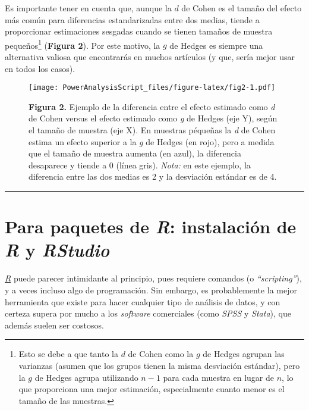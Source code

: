 \documentclass[
]{article}
\begin{document}
Es importante tener en cuenta que, aunque la \(d\) de Cohen es el tamaño
del efecto más común para diferencias estandarizadas entre dos medias,
tiende a proporcionar estimaciones sesgadas cuando se tienen tamaños de
muestra pequeños\footnote{Esto se debe a que tanto la \(d\) de Cohen
  como la \(g\) de Hedges agrupan las varianzas (asumen que los grupos
  tienen la misma desviación estándar), pero la \(g\) de Hedges agrupa
  utilizando \(n - 1\) para cada muestra en lugar de \(n\), lo que
  proporciona una mejor estimación, especialmente cuanto menor es el
  tamaño de las muestras.} (\textbf{Figura 2}). Por este motivo, la
\(g\) de Hedges es siempre una alternativa valiosa que encontrarás en
muchos artículos (y que, sería mejor usar en todos los casos).

\begin{figure}
\centering
\texttt{[image: PowerAnalysisScript\_files/figure-latex/fig2-1.pdf]}
\caption{\textbf{Figura 2.} Ejemplo de la diferencia entre el efecto
estimado como \emph{d} de Cohen versus el efecto estimado como \emph{g}
de Hedges (eje Y), según el tamaño de muestra (eje X). En muestras
péqueñas la \emph{d} de Cohen estima un efecto superior a la \emph{g} de
Hedges (en rojo), pero a medida que el tamaño de muestra aumenta (en
azul), la diferencia desaparece y tiende a 0 (línea gris). \emph{Nota:}
en este ejemplo, la diferencia entre las dos medias es 2 y la desviación
estándar es de 4.}
\end{figure}

\begin{center}\rule{0.5\linewidth}{0.5pt}\end{center}

\hypertarget{para-paquetes-de-r-instalaciuxf3n-de-r-y-rstudio}{%
\section{\texorpdfstring{Para paquetes de \emph{R}: instalación de
\emph{R} y
\emph{RStudio}}{Para paquetes de R: instalación de R y RStudio}}\label{para-paquetes-de-r-instalaciuxf3n-de-r-y-rstudio}}

\href{https://www.r-project.org/}{\emph{R}} puede parecer intimidante al
principio, pues requiere comandos (o \emph{``scripting''}), y a veces
incluso algo de programación. Sin embargo, es probablemente la mejor
herramienta que existe para hacer cualquier tipo de análisis de datos, y
con certeza supera por mucho a los \emph{software} comerciales (como
\emph{SPSS} y \emph{Stata}), que además suelen ser costosos.
\end{document}
